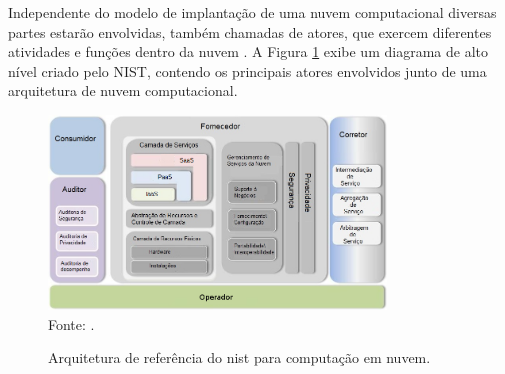 Independente do modelo de implantação de uma nuvem computacional diversas partes estarão envolvidas, também chamadas de atores, que exercem diferentes atividades e funções dentro da nuvem \cite{nist:modeloreferencia}.
%
A Figura \ref{fig:nist_taxonomy} exibe um diagrama de alto nível criado pelo NIST, contendo os principais atores envolvidos junto de uma arquitetura de nuvem computacional. 

\begin{figure}[!htb]
	\centering
	\caption{Arquitetura de referência do \ac{nist} para computação em nuvem.}
	\includegraphics[width=0.8\textwidth]{img/nist_taxonomia.png}
	\label{fig:nist_taxonomy}\\
	Fonte: \cite{nist:modeloreferencia}.
\end{figure}

